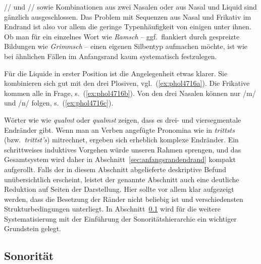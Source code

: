 // und // sowie Kombinationen aus zwei Nasalen oder aus Nasal und Liquid sind gänzlich ausgeschlossen.
Das Problem mit Sequenzen aus Nasal und Frikativ im Endrand ist also vor allem die geringe Typenhäufigkeit von einigen unter ihnen.
Ob man \zB für ein einzelnes Wort wie \textit{Ramsch} -- ggf.\ flankiert durch gespreizte Bildungen wie \textit{Grimmsch} -- einen eigenen Silbentyp aufmachen möchte, ist wie bei ähnlichen Fällen im Anfangsrand kaum systematisch festzulegen.

Für die Liquide in erster Position ist die Angelegenheit etwas klarer.
Sie kombinieren sich gut mit den drei Plosiven, vgl.\ (\ref{ex:phol4716a}).
Die Frikative kommen alle in Frage, s.\ (\ref{ex:phol4716b}).
Von den drei Nasalen können nur /m/ und /n/ folgen, s.\ (\ref{ex:phol4716c}).

\begin{exe}
  \ex\label{ex:phol4716}
  \begin{xlist}
  \end{xlist}
\end{exe}

Wörter wie wie \textit{qualmt} oder \textit{qualmst} zeigen, dass es drei- und viersegmentale Endränder gibt.
Wenn man \zB an Verben angefügte Pronomina wie in \textit{trittsts} (bzw.\ \textit{trittst's}) mitrechnet, ergeben sich erheblich komplexe Endränder. 
Ein schrittweises induktives Vorgehen würde unseren Rahmen sprengen, und das Gesamtsystem wird daher in Abschnitt~\ref{sec:anfangsrandendrand} kompakt aufgerollt.
Falls der in diesem Abschnitt abgelieferte deskriptive Befund unübersichtlich erscheint, leistet der genannte Abschnitt auch eine deutliche Reduktion auf Seiten der Darstellung.
Hier sollte vor allem klar aufgezeigt werden, dass die Besetzung der Ränder nicht beliebig ist und verschiedensten Strukturbedingungen unterliegt.
In Abschnitt~\ref{sec:sonoritaet} wird für die weitere Systematisierung mit der Einführung der Sonoritätshierarchie ein wichtiger Grundstein gelegt.


\subsection{Sonorität}

\label{sec:sonoritaet}

